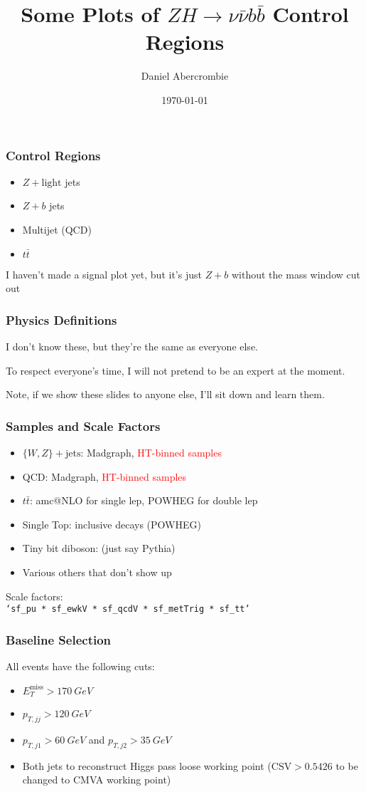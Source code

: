 \documentclass{beamer}
\author[D. Abercrombie]{
  Daniel Abercrombie
}
\title{\bf \sffamily Some Plots of $ZH \rightarrow \nu\bar{\nu} b\bar{b}$ Control Regions}
\date{\today}
\newcommand{\ttbar}{\ensuremath{t\bar{t}}}
\newcommand{\MET}{\ensuremath{E_{T}^{\mathrm{miss}}}}
\begin{document}
\begin{frame}[nonumbering]
  \titlepage
\end{frame}

\begin{frame}
  \frametitle{Control Regions}
  \begin{itemize}
  \item $Z + \mathrm{light}$ jets
  \item $Z + b$ jets
  \item Multijet (QCD)
  \item \ttbar
  \end{itemize}
  I haven't made a signal plot yet,
  but it's just $Z + b$ without the mass window cut out
\end{frame}

\begin{frame}
  \frametitle{Physics Definitions}
  I don't know these, but they're the same as everyone else.

  \vspace{12pt}

  To respect everyone's time, I will not pretend to be an expert at the moment.

  \vspace{12pt}

  Note, if we show these slides to anyone else, I'll sit down and learn them.
\end{frame}

\begin{frame}
  \frametitle{Samples and Scale Factors}
  \begin{itemize}
  \item $\{W,Z\} + \mathrm{jets}$: Madgraph, \textcolor{red}{HT-binned samples}
  \item QCD: Madgraph, \textcolor{red}{HT-binned samples}
  \item \ttbar: amc@NLO for single lep, POWHEG for double lep
  \item Single Top: inclusive decays (POWHEG)
  \item Tiny bit diboson: (just say Pythia)
  \item Various others that don't show up
  \end{itemize}

  Scale factors: \\ \centering \tt{`sf\_pu * sf\_ewkV * sf\_qcdV * sf\_metTrig * sf\_tt'}
\end{frame}

\begin{frame}
  \frametitle{Baseline Selection}
  All events have the following cuts:

  \begin{itemize}
  \item $\MET > \SI{170}{GeV}$
  \item $p_{T, jj} > \SI{120}{GeV}$
  \item $p_{T, j1} > \SI{60}{GeV}$ and $p_{T, j2} > \SI{35}{GeV}$
  \item Both jets to reconstruct Higgs pass loose working point
    ($\mathrm{CSV} > 0.5426$ to be changed to CMVA working point)
  \end{itemize}
\end{frame}
\end{document}
